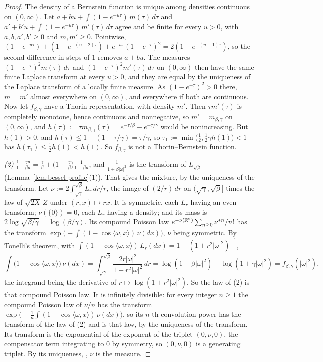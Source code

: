 \begin{proof}
The density of a Bernstein function is unique among densities continuous on $(0, \infty)$. Let
$a + bu + \int(1 - e^{-u\tau})\,m(\tau)\,d\tau$ and $a' + b'u + \int(1 - e^{-u\tau})\,m'(\tau)\,d\tau$
agree and be finite for every $u > 0$, with $a, b, a', b' \ge 0$ and $m, m' \ge 0$. Pointwise,
$(1 - e^{-u\tau}) + (1 - e^{-(u+2)\tau}) + e^{-u\tau}(1 - e^{-\tau})^2 = 2(1 - e^{-(u+1)\tau})$, so the
second difference in steps of $1$ removes $a + bu$. The measures $(1 - e^{-\tau})^2m(\tau)\,d\tau$ and
$(1 - e^{-\tau})^2m'(\tau)\,d\tau$ on $(0, \infty)$ then have the same finite Laplace transform at
every $u > 0$, and they are equal by the uniqueness of the Laplace transform of a locally finite
measure. As $(1 - e^{-\tau})^2 > 0$ there, $m = m'$ almost everywhere on $(0, \infty)$, and
everywhere if both are continuous. Now let $f_{\beta,\gamma}$ have a Thorin representation, with
density $m'$. Then $\tau m'(\tau)$ is completely monotone, hence continuous and nonnegative, so
$m' = m_{\beta,\gamma}$ on $(0, \infty)$, and $h(\tau) := \tau m_{\beta,\gamma}(\tau) =
e^{-\tau/\beta} - e^{-\tau/\gamma}$ would be nonincreasing. But $h(1) > 0$, and
$h(\tau) \le 1 - (1 - \tau/\gamma) = \tau/\gamma$, so
$\tau_1 := \min\bigl(\tfrac12, \tfrac12\gamma h(1)\bigr) < 1$ has $h(\tau_1) \le \tfrac12h(1) < h(1)$.
So $f_{\beta,\gamma}$ is not a Thorin--Bernstein function.

\emph{(2)} $\frac{1 + \gamma u}{1 + \beta u} = \frac\gamma\beta + \bigl(1 - \frac\gamma\beta\bigr)
\frac{1}{1 + \beta u}$, and $\frac{1}{1 + \beta|\omega|^2}$ is the transform of $L_{\sqrt\beta}$
(Lemma~\ref{lem:bessel-profile}(1)). That gives the mixture, by the uniqueness of the transform.
Let $\nu := 2\int_{\sqrt\gamma}^{\sqrt\beta}L_r\,dr/r$, the image of $(2/r)\,dr$ on
$(\sqrt\gamma, \sqrt\beta]$ times the law of $\sqrt{2X}\,Z$ under $(r, x) \mapsto rx$. It is symmetric,
each $L_r$ having an even transform; $\nu(\{0\}) = 0$, each $L_r$ having a density; and its mass is
$2\log\sqrt{\beta/\gamma} = \log(\beta/\gamma)$. Its compound Poisson law
$e^{-\nu(\mathbb{R}^d)}\sum_{n \ge 0}\nu^{*n}/n!$ has the transform
$\exp\bigl(-\int(1 - \cos\langle\omega, x\rangle)\,\nu(dx)\bigr)$, $\nu$ being symmetric. By
Tonelli's theorem, with $\int(1 - \cos\langle\omega, x\rangle)\,L_r(dx) = 1 - (1 + r^2|\omega|^2)^{-1}$,
\[
  \int\bigl(1 - \cos\langle\omega, x\rangle\bigr)\,\nu(dx)
   = \int_{\sqrt\gamma}^{\sqrt\beta}\frac{2r|\omega|^2}{1 + r^2|\omega|^2}\,dr
   = \log(1 + \beta|\omega|^2) - \log(1 + \gamma|\omega|^2) = f_{\beta,\gamma}(|\omega|^2) ,
\]
the integrand being the derivative of $r \mapsto \log(1 + r^2|\omega|^2)$. So the law of (2) is that
compound Poisson law. It is infinitely divisible: for every integer $n \ge 1$ the compound Poisson
law of $\nu/n$ has the transform $\exp\bigl(-\tfrac1n\int(1 - \cos\langle\omega, x\rangle)\,
\nu(dx)\bigr)$, so its $n$-th convolution power has the transform of the law of (2) and is that
law, by the uniqueness of the transform. Its transform is the exponential of the exponent of the triplet $(0, \nu, 0)$,
the compensator term integrating to $0$ by symmetry, so $(0, \nu, 0)$ is a generating triplet. By
its uniqueness, , $\nu$ is the \Levy{}
measure.


\end{proof}
